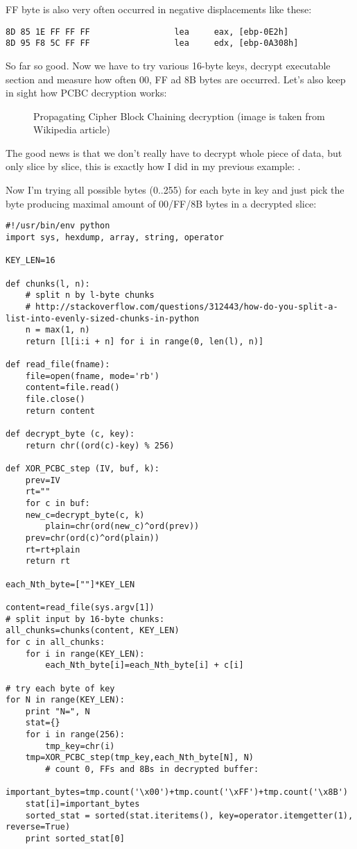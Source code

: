 FF byte is also very often occurred in negative displacements like these:

\begin{lstlisting}
8D 85 1E FF FF FF                 lea     eax, [ebp-0E2h]
8D 95 F8 5C FF FF                 lea     edx, [ebp-0A308h]
\end{lstlisting}

So far so good. Now we have to try various 16-byte keys, decrypt executable section and measure how often 00, FF ad 8B bytes are occurred.
Let's also keep in sight how PCBC decryption works:

\begin{figure}[H]
\centering
{}
\caption{Propagating Cipher Block Chaining decryption (image is taken from Wikipedia article)}
\end{figure}

The good news is that we don't really have to decrypt whole piece of data, but only slice by slice, this is exactly how I did in my previous example: .

Now I'm trying all possible bytes (0..255) for each byte in key and just pick the byte producing maximal amount of 00/FF/8B bytes in a decrypted slice:

\begin{lstlisting}
#!/usr/bin/env python
import sys, hexdump, array, string, operator

KEY_LEN=16

def chunks(l, n):
    # split n by l-byte chunks
    # http://stackoverflow.com/questions/312443/how-do-you-split-a-list-into-evenly-sized-chunks-in-python
    n = max(1, n)
    return [l[i:i + n] for i in range(0, len(l), n)]

def read_file(fname):
    file=open(fname, mode='rb')
    content=file.read()
    file.close()
    return content

def decrypt_byte (c, key):
    return chr((ord(c)-key) % 256)

def XOR_PCBC_step (IV, buf, k):
    prev=IV
    rt=""
    for c in buf:
	new_c=decrypt_byte(c, k)
        plain=chr(ord(new_c)^ord(prev))
	prev=chr(ord(c)^ord(plain))
	rt=rt+plain
    return rt

each_Nth_byte=[""]*KEY_LEN

content=read_file(sys.argv[1])
# split input by 16-byte chunks:
all_chunks=chunks(content, KEY_LEN)
for c in all_chunks:
    for i in range(KEY_LEN):
        each_Nth_byte[i]=each_Nth_byte[i] + c[i]

# try each byte of key
for N in range(KEY_LEN):
    print "N=", N
    stat={}
    for i in range(256):
        tmp_key=chr(i)
	tmp=XOR_PCBC_step(tmp_key,each_Nth_byte[N], N)
        # count 0, FFs and 8Bs in decrypted buffer:
	important_bytes=tmp.count('\x00')+tmp.count('\xFF')+tmp.count('\x8B')
	stat[i]=important_bytes
    sorted_stat = sorted(stat.iteritems(), key=operator.itemgetter(1), reverse=True)
    print sorted_stat[0]
\end{lstlisting}

